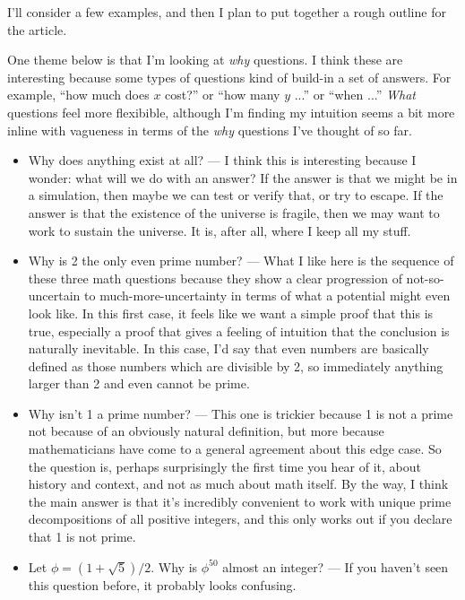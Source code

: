 \documentclass[11pt, oneside]{article}   	%
\begin{document}
I'll consider a few examples, and then I plan to put together a rough outline
for the article.

One theme below is that I'm looking at {\em why} questions. I think these are
interesting because some types of questions kind of build-in a set of answers.
For example, ``how much does $x$ cost?'' or ``how many $y$ ...'' or ``when ...''
{\em What} questions feel more flexibible, although I'm finding my intuition
seems a bit more inline with vagueness in terms of the {\em why} questions I've
thought of so far.

\begin{itemize}
    \item Why does anything exist at all? --- I think this is interesting
        because I wonder: what will we do with an answer? If the answer is that
        we might be in a simulation, then maybe we can test or verify that, or
        try to escape. If the answer is that the existence of the universe is
        fragile, then we may want to work to sustain the universe. It is, after
        all, where I keep all my stuff.
    \item Why is 2 the only even prime number? --- What I like here is the
        sequence of these three math questions because they show a clear
        progression of not-so-uncertain to much-more-uncertainty in terms of
        what a potential might even look like. In this first case, it feels like
        we want a simple proof that this is true, especially a proof that gives
        a feeling of intuition that the conclusion is naturally inevitable. In
        this case, I'd say that even numbers are basically defined as those
        numbers which are divisible by 2, so immediately anything larger than 2
        and even cannot be prime.
    \item Why isn't 1 a prime number? --- This one is trickier because 1 is not
        a prime not because of an obviously natural definition, but more because
        mathematicians have come to a general agreement about this edge case. So
        the question is, perhaps surprisingly the first time you hear of it,
        about history and context, and not as much about math itself. By the
        way, I think the main answer is that it's incredibly convenient to work
        with unique prime decompositions of all positive integers, and this only
        works out if you declare that 1 is not prime.
    \item Let $\phi=(1+\sqrt 5)/2.$ Why is $\phi^{50}$ almost an integer? --- If
        you haven't seen this question before, it probably looks confusing.

\end{itemize}
\end{document}

